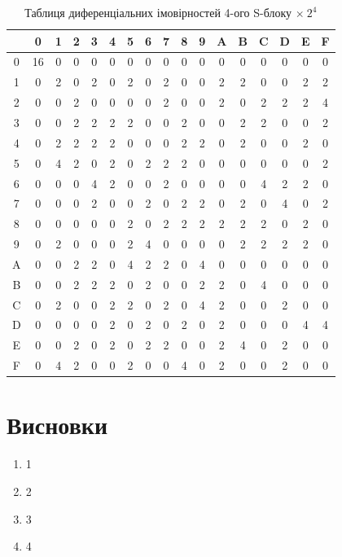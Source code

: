 \documentclass[12pt,a4paper]{article}
\begin{document}
\begin{table}[h!]
\centering
\begin{tabular}{|c|c|c|c|c|c|c|c|c|c|c|c|c|c|c|c|c|}
\hline
\backslashbox{$\alpha$}{$\beta$}  & 0  & 1 & 2 & 3 & 4 & 5 & 6 & 7 & 8 & 9 & A & B & C & D & E & F \\ \hline
0 & 16 & 0 & 0 & 0 & 0 & 0 & 0 & 0 & 0 & 0 & 0 & 0 & 0 & 0 & 0 & 0 \\ \hline
1 & 0  & 2 & 0 & 2 & 0 & 2 & 0 & 2 & 0 & 0 & 2 & 2 & 0 & 0 & 2 & 2 \\ \hline
2 & 0  & 0 & 2 & 0 & 0 & 0 & 0 & 2 & 0 & 0 & 2 & 0 & 2 & 2 & 2 & 4 \\ \hline
3 & 0  & 0 & 2 & 2 & 2 & 2 & 0 & 0 & 2 & 0 & 0 & 2 & 2 & 0 & 0 & 2 \\ \hline
4 & 0  & 2 & 2 & 2 & 2 & 0 & 0 & 0 & 2 & 2 & 0 & 2 & 0 & 0 & 2 & 0 \\ \hline
5 & 0  & 4 & 2 & 0 & 2 & 0 & 2 & 2 & 2 & 0 & 0 & 0 & 0 & 0 & 0 & 2 \\ \hline
6 & 0  & 0 & 0 & 4 & 2 & 0 & 0 & 2 & 0 & 0 & 0 & 0 & 4 & 2 & 2 & 0 \\ \hline
7 & 0  & 0 & 0 & 2 & 0 & 0 & 2 & 0 & 2 & 2 & 0 & 2 & 0 & 4 & 0 & 2 \\ \hline
8 & 0  & 0 & 0 & 0 & 0 & 2 & 0 & 2 & 2 & 2 & 2 & 2 & 2 & 0 & 2 & 0 \\ \hline
9 & 0  & 2 & 0 & 0 & 0 & 2 & 4 & 0 & 0 & 0 & 0 & 2 & 2 & 2 & 2 & 0 \\ \hline
A & 0  & 0 & 2 & 2 & 0 & 4 & 2 & 2 & 0 & 4 & 0 & 0 & 0 & 0 & 0 & 0 \\ \hline
B & 0  & 0 & 2 & 2 & 2 & 0 & 2 & 0 & 0 & 2 & 2 & 0 & 4 & 0 & 0 & 0 \\ \hline
C & 0  & 2 & 0 & 0 & 2 & 2 & 0 & 2 & 0 & 4 & 2 & 0 & 0 & 2 & 0 & 0 \\ \hline
D & 0  & 0 & 0 & 0 & 2 & 0 & 2 & 0 & 2 & 0 & 2 & 0 & 0 & 0 & 4 & 4 \\ \hline
E & 0  & 0 & 2 & 0 & 2 & 0 & 2 & 2 & 0 & 0 & 2 & 4 & 0 & 2 & 0 & 0 \\ \hline
F & 0  & 4 & 2 & 0 & 0 & 2 & 0 & 0 & 4 & 0 & 2 & 0 & 0 & 2 & 0 & 0 \\ \hline
\end{tabular}
\caption{Таблиця диференціальних імовірностей 4-ого S-блоку $\times \: 2^4$}
\label{tab:sBoxDiffTab}
\end{table}



\section{Висновки}

\begin{enumerate}

\item 1
\item 2
\item 3
\item 4

\end{enumerate}
\end{document}
